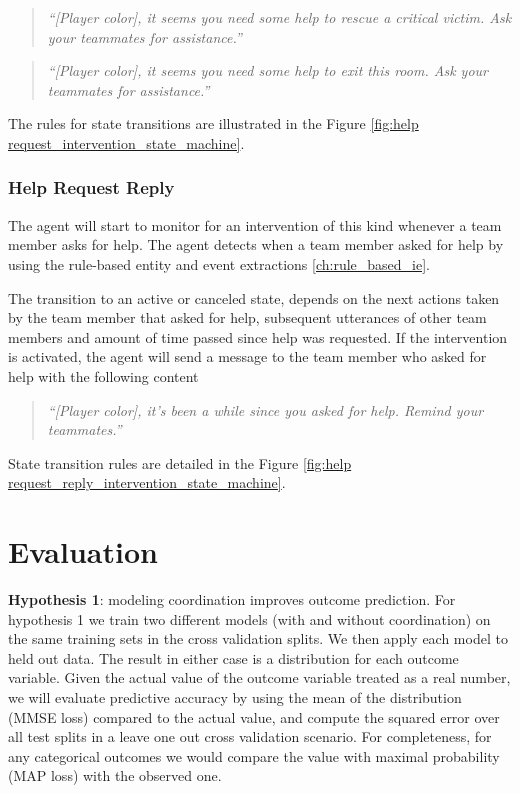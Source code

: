 \begin{quote} 
    \centering 
    \emph{``[Player color], it seems you need some help to rescue a critical victim. Ask your teammates for assistance.''}
\end{quote}

\begin{quote} 
    \centering 
    \emph{``[Player color], it seems you need some help to exit this room. Ask your teammates for assistance.''}
\end{quote}

The rules for state transitions are illustrated in the Figure \ref{fig:help request_intervention_state_machine}.

\subsubsection{Help Request Reply}

The agent will start to monitor for an intervention of this kind whenever a team member asks for help. The agent detects when a team member asked for help by using the rule-based entity and event extractions \ref{ch:rule_based_ie}.

The transition to an active or canceled state, depends on the next actions taken by the team member that asked for help, subsequent utterances of other team members and amount of time passed since help was requested. If the intervention is activated, the agent will send a message to the team member who asked for help with the following content

\begin{quote} 
    \centering 
    \emph{``[Player color], it's been a while since you asked for help. Remind your teammates.''}
\end{quote}

State transition rules are detailed in the Figure \ref{fig:help request_reply_intervention_state_machine}.

\section{Evaluation}

\textbf{Hypothesis 1}: modeling coordination improves outcome prediction.  For
hypothesis 1 we train two different models (with and without coordination) on
the same training sets in the cross validation splits. We then apply each model
to held out data. The result in either case is a distribution for each outcome
variable. Given the actual value of the outcome variable treated as a real
number, we will evaluate predictive accuracy by using the mean of the
distribution (MMSE loss) compared to the actual value, and compute the squared
error over all test splits in a leave one out cross validation scenario. For
completeness, for any categorical outcomes we would compare the value with
maximal probability (MAP loss) with the observed one. 

